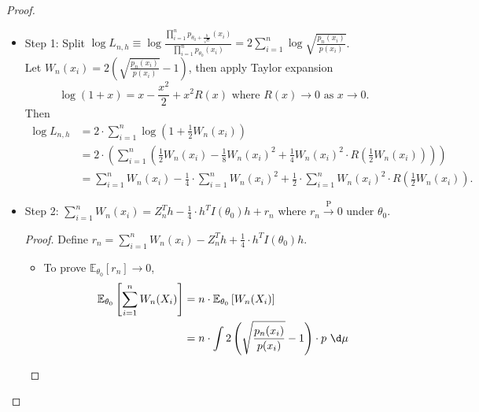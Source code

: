 \documentclass[a4paper]{article}
\begin{document}
\begin{proof}
\begin{itemize}[leftmargin=*]
\begin{proof}
\begin{itemize}
\begin{equation*}
				\end{equation*}
				So this shows $\mathbb{E}_{\theta_0} \left[\dot{l} (X_i)^T h\right] = 0$, also $\mathbb{E}_{\theta_0} \left[Z_n^T h\right] = 0$.
			\end{itemize}
		\end{proof}
		\item Step 1: Split $\log L_{n,h} \equiv \log \frac{\prod\limits_{i=1}^n p_{\theta_0 + \frac{h}{\sqrt{n}}} (x_i)}{\prod\limits_{i=1}^n p_{\theta_0} (x_i)} = 2 \sum\limits_{i=1}^n \log \sqrt{\frac{p_n(x_i)}{p(x_i)}}$.\\
		Let $W_n(x_i) = 2 \left(\sqrt{\frac{p_n(x_i)}{p(x_i)}} -1\right)$, then apply Taylor expansion
		\begin{equation*}
			\log (1+x) = x - \frac{x^2}{2} + x^2 R(x) \text{ where $R(x) \to 0$ as $x \to 0$}.
		\end{equation*}
		Then
		\begin{equation*}
			\begin{aligned}
				\log L_{n,h} &= 2 \cdot \sum\limits_{i=1}^n \log \left(1 + \frac{1}{2} W_n(x_i)\right) \\
				&= 2 \cdot \left( \sum\limits_{i=1}^n \left(\frac{1}{2} W_n(x_i) - \frac{1}{8} W_n(x_i)^2 +  \frac{1}{4} W_n(x_i)^2 \cdot R \left(\frac{1}{2} W_n(x_i)\right)\right) \right) \\
				&= \sum\limits_{i=1}^n W_n(x_i) - \frac{1}{4} \cdot \sum\limits_{i=1}^n W_n(x_i)^2 + \frac{1}{2} \cdot \sum\limits_{i=1}^n W_n(x_i)^2 \cdot R\left(\frac{1}{2} W_n(x_i)\right).
			\end{aligned}
		\end{equation*}
		\item Step 2: $\sum\limits_{i=1}^n W_n(x_i) = Z_n^Th - \frac{1}{4} \cdot h^T I(\theta_0) h + r_n$ where $r_n \stackrel{\text{P}}{\longrightarrow} 0$ under $\theta_0$.
		\begin{proof}
			Define $r_n = \sum\limits_{i=1}^n W_n(x_i) - Z_n^Th + \frac{1}{4} \cdot h^T I(\theta_0) h$.
			\begin{itemize}
				\item To prove $\mathbb{E}_{\theta_0}[r_n] \to 0$,
				\begin{equation*}
					\begin{aligned}
						\mathbb{E}_{\theta_0} \left[\sum\limits_{i=1}^n W_n(X_i)\right] &= n \cdot \mathbb{E}_{\theta_0} \left[W_n(X_i)\right] \\
						&= n \cdot \int 2 \left(\sqrt{\frac{p_n(x_i)}{p(x_i)}} -1\right) \cdot p \ \d \mu \\

\end{aligned}
\end{equation*}
\end{itemize}
\end{proof}
\end{itemize}
\end{proof}
\end{document}
